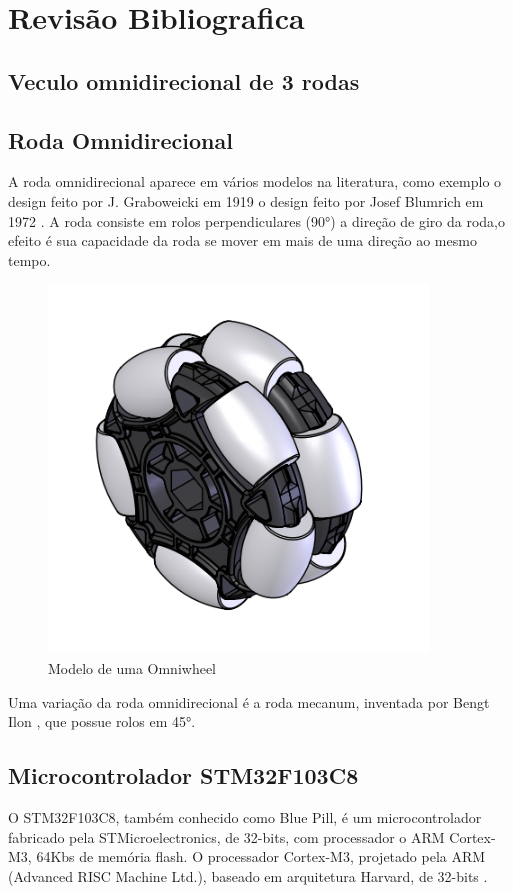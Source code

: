 
\chapter{Revisão Bibliografica}

\section{Veculo omnidirecional de 3 rodas}

\section{Roda Omnidirecional}

A roda omnidirecional aparece em vários modelos na literatura, como exemplo o design feito por J. Graboweicki em 1919 \cite{patent_US1305535A}
o design feito por Josef Blumrich em 1972 \cite{patent_US3789947A}.
A roda consiste em rolos perpendiculares (90°) a direção de giro da roda,o efeito é sua capacidade da roda se mover em mais de uma direção ao mesmo tempo.

\begin{figure}[h]
	\centering
	\includegraphics{figures/omniwheel}
	\caption{Modelo de uma Omniwheel \cite{draw_omniwheel}}
\end{figure}

Uma variação da roda omnidirecional é a roda mecanum, inventada por Bengt Ilon \cite{patent_US3876255A}, que possue rolos em 45°.


\section{Microcontrolador STM32F103C8}
O STM32F103C8, também conhecido como Blue Pill, é um microcontrolador fabricado pela STMicroelectronics, de 32-bits, com processador o ARM Cortex-M3, 64Kbs de memória flash.
O processador Cortex-M3, projetado pela ARM (Advanced RISC Machine Ltd.), baseado em arquitetura Harvard, de 32-bits \cite{cortex_m3}.


